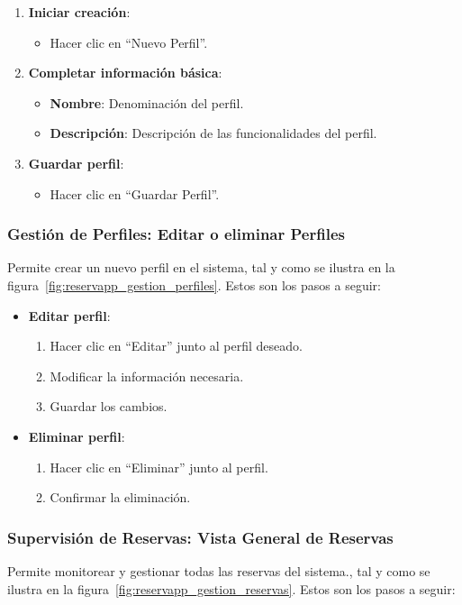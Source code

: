 \begin{enumerate}
   \item \textbf{Iniciar creación}:
   \begin{itemize}
      \item Hacer clic en ``Nuevo Perfil''.
   \end{itemize}
   \item \textbf{Completar información básica}:
   \begin{itemize}
      \item \textbf{Nombre}: Denominación del perfil.
      \item \textbf{Descripción}: Descripción de las funcionalidades del perfil.
   \end{itemize}
   \item \textbf{Guardar perfil}:
   \begin{itemize}
      \item Hacer clic en ``Guardar Perfil''.
   \end{itemize}
\end{enumerate}

\subsubsection{Gestión de Perfiles: Editar o eliminar Perfiles}
Permite crear un nuevo perfil en el sistema, tal y como se ilustra en la figura~\ref{fig:reservapp_gestion_perfiles}. Estos son los pasos a seguir:

\begin{itemize}
   \item \textbf{Editar perfil}:
   \begin{enumerate}
      \item Hacer clic en ``Editar'' junto al perfil deseado.
	  \item Modificar la información necesaria.
	  \item Guardar los cambios.
   \end{enumerate}
   \item \textbf{Eliminar perfil}:
   \begin{enumerate}
      \item Hacer clic en ``Eliminar'' junto al perfil.
      \item Confirmar la eliminación.
   \end{enumerate}
\end{itemize}

\subsubsection{Supervisión de Reservas: Vista General de Reservas}
Permite monitorear y gestionar todas las reservas del sistema., tal y como se ilustra en la figura~\ref{fig:reservapp_gestion_reservas}. Estos son los pasos a seguir:

